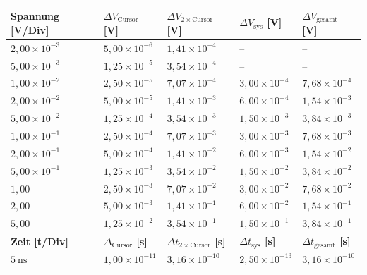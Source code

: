\onecolumn
\begin{table}[h!]
    \vspace{-0.73cm}
    \centering
    \begin{tabular}{l|l|l|l||l}
    \toprule
    \textbf{Spannung [V/Div]} & \textbf{$\Delta V_{\text{Cursor}}$ [V]} & \textbf{$\Delta V_{2\times \text{Cursor}}$ [V]} & \textbf{$\Delta V_{\text{sys}}$ [V]} & \textbf{$\Delta V_{\text{gesamt}}$ [V]} \\
    \midrule
    \(2,00\times 10^{-3}\) & \(5,00\times 10^{-6}\) & \(1,41\times 10^{-4}\) & -- & -- \\
    \(5,00\times 10^{-3}\) & \(1,25\times 10^{-5}\) & \(3,54\times 10^{-4}\) & -- & -- \\
    \(1,00\times 10^{-2}\) & \(2,50\times 10^{-5}\) & \(7,07\times 10^{-4}\) & \(3,00\times 10^{-4}\) & \(7,68\times 10^{-4}\) \\
    \(2,00\times 10^{-2}\) & \(5,00\times 10^{-5}\) & \(1,41\times 10^{-3}\) & \(6,00\times 10^{-4}\) & \(1,54\times 10^{-3}\) \\
    \(5,00\times 10^{-2}\) & \(1,25\times 10^{-4}\) & \(3,54\times 10^{-3}\) & \(1,50\times 10^{-3}\) & \(3,84\times 10^{-3}\) \\
    \(1,00\times 10^{-1}\) & \(2,50\times 10^{-4}\) & \(7,07\times 10^{-3}\) & \(3,00\times 10^{-3}\) & \(7,68\times 10^{-3}\) \\
    \(2,00\times 10^{-1}\) & \(5,00\times 10^{-4}\) & \(1,41\times 10^{-2}\) & \(6,00\times 10^{-3}\) & \(1,54\times 10^{-2}\) \\
    \(5,00\times 10^{-1}\) & \(1,25\times 10^{-3}\) & \(3,54\times 10^{-2}\) & \(1,50\times 10^{-2}\) & \(3,84\times 10^{-2}\) \\
    \(1,00\) & \(2,50\times 10^{-3}\) & \(7,07\times 10^{-2}\) & \(3,00\times 10^{-2}\) & \(7,68\times 10^{-2}\) \\
    \(2,00\) & \(5,00\times 10^{-3}\) & \(1,41\times 10^{-1}\) & \(6,00\times 10^{-2}\) & \(1,54\times 10^{-1}\) \\
    \(5,00\) & \(1,25\times 10^{-2}\) & \(3,54\times 10^{-1}\) & \(1,50\times 10^{-1}\) & \(3,84\times 10^{-1}\) \\
    \midrule
    \midrule
    \textbf{Zeit [t/Div]} & \textbf{$\Delta_{\text{Cursor}}$ [s]} & \textbf{$\Delta t_{2\times \text{Cursor}}$ [s]} & \textbf{$\Delta t_{\text{sys}}$ [s]} & \textbf{$\Delta t_{\text{gesamt}}$ [s]} \\
    \midrule
\(5~\text{ns}\) & \(1,00\times 10^{-11}\) & \(3,16\times 10^{-10}\) & \(2,50\times 10^{-13}\) & \(3,16\times 10^{-10}\) \\

\end{tabular}
\end{table}
